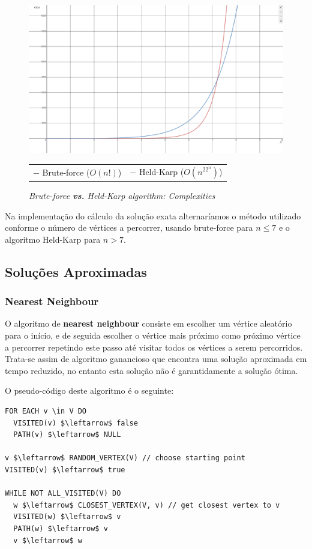 \documentclass[article, a4paper, 12pt, oneside]{memoir}
\begin{document}
\begin{figure}
\centering
\includegraphics[scale=0.3]{tsp_exact_complexity}
\caption{\emph{Brute-force \textbf{vs.} Held-Karp algorithm: Complexities}}
\begin{tabular}{ l r }
\color{red} $-$ \color{black} Brute-force ($O(n!)$) & \color{blue} $-$ \color{black} Held-Karp ($O(n^22^n)$)
\end{tabular}
\end{figure}

Na implementação do cálculo da solução exata alternaríamos o método utilizado conforme o número de vértices a percorrer, usando brute-force para $n \leq 7$ e o algoritmo Held-Karp para $n > 7$. 

\subsection{Soluções Aproximadas}
\subsubsection{Nearest Neighbour}
O algoritmo de \textbf{nearest neighbour} consiste em escolher um vértice aleatório para o início, e de seguida escolher o vértice mais próximo como próximo vértice a percorrer repetindo este passo até visitar todos os vértices a serem percorridos. Trata-se assim de algoritmo ganancioso que encontra uma solução aproximada em tempo reduzido, no entanto esta solução não é garantidamente a solução ótima.

O pseudo-código deste algoritmo é o seguinte:
\begin{lstlisting}[frame=single, mathescape=true]
FOR EACH v \in V DO
  VISITED(v) $\leftarrow$ false
  PATH(v) $\leftarrow$ NULL

v $\leftarrow$ RANDOM_VERTEX(V) // choose starting point
VISITED(v) $\leftarrow$ true

WHILE NOT ALL_VISITED(V) DO
  w $\leftarrow$ CLOSEST_VERTEX(V, v) // get closest vertex to v
  VISITED(w) $\leftarrow$ v 
  PATH(w) $\leftarrow$ v
  v $\leftarrow$ w
\end{lstlisting}
\end{document}
